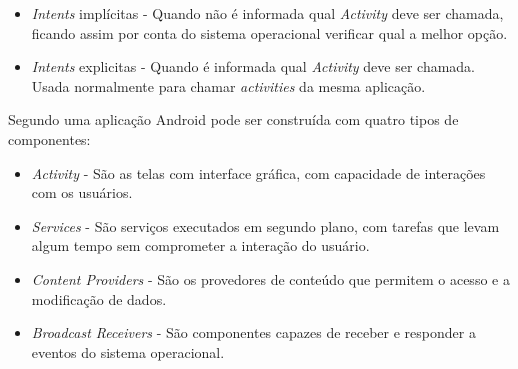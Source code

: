 	\begin{itemize}
	  
	  \item \textit{Intents} implícitas - Quando não é informada qual
	  \textit{Activity} deve ser chamada, ficando assim por conta do sistema
	  operacional verificar qual a melhor opção.
	  
	  \item \textit{Intents} explicitas - Quando é informada qual
	  \textit{Activity} deve ser chamada. Usada normalmente para chamar
	  \textit{activities} da mesma aplicação.
	  
	\end{itemize}
	
	\par Segundo  uma aplicação Android pode ser construída com
quatro tipos de componentes:

	\begin{itemize}
	  
	  \item \textit{Activity} - São as telas com interface gráfica, com capacidade
	  de interações com os usuários.
	  
	  \item \textit{Services} - São serviços executados em segundo plano, com
	  tarefas que levam algum tempo sem comprometer a interação do usuário. 
	  
	  \item \textit{Content Providers} - São os provedores de conteúdo que permitem
	  o acesso e a modificação de dados. 
	  
	  \item \textit{Broadcast Receivers} - São componentes capazes de receber e
	  responder a eventos do sistema operacional. 
	
	\end{itemize}
	  
